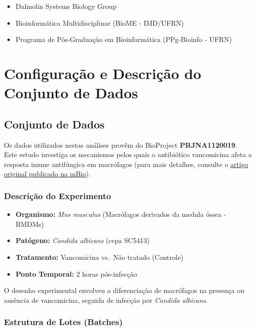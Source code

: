 \documentclass[
  letterpaper,
  DIV=11,
  numbers=noendperiod]{scrreprt}
\providecommand{\tightlist}{%
  \setlength{\itemsep}{0pt}\setlength{\parskip}{0pt}}
\begin{document}
\begin{itemize}
\tightlist
\item
  Dalmolin Systems Biology Group
\item
  Bioinformática Multidisciplinar (BioME - IMD/UFRN)
\item
  Programa de Pós-Graduação em Bioinformática (PPg-Bioinfo - UFRN)
\end{itemize}


\chapter{Configuração e Descrição do Conjunto de
Dados}\label{configurauxe7uxe3o-e-descriuxe7uxe3o-do-conjunto-de-dados}

\section{Conjunto de Dados}\label{conjunto-de-dados}

Os dados utilizados nestas análises provêm do BioProject
\textbf{PRJNA1120019}. Este estudo investiga os mecanismos pelos quais o
antibiótico vancomicina afeta a resposta imune antifúngica em macrófagos
(para mais detalhes, consulte o
\href{https://journals.asm.org/doi/pdf/10.1128/mbio.00580-26}{artigo
original publicado na mBio}).

\subsection{Descrição do
Experimento}\label{descriuxe7uxe3o-do-experimento}

\begin{itemize}
\tightlist
\item
  \textbf{Organismo:} \emph{Mus musculus} (Macrófagos derivados da
  medula óssea - BMDMs)
\item
  \textbf{Patógeno:} \emph{Candida albicans} (cepa SC5413)
\item
  \textbf{Tratamento:} Vancomicina vs.~Não tratado (Controle)
\item
  \textbf{Ponto Temporal:} 2 horas pós-infecção
\end{itemize}

O desenho experimental envolveu a diferenciação de macrófagos na
presença ou ausência de vancomicina, seguida de infecção por
\emph{Candida albicans}.

\subsection{Estrutura de Lotes
(Batches)}\label{estrutura-de-lotes-batches}
\end{document}
